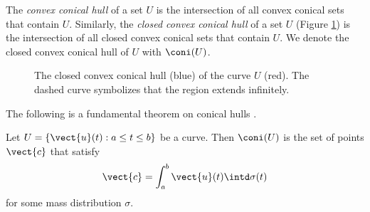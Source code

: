 The \emph{convex conical hull} of a set $U$ is the intersection of all convex conical sets that contain $U$. Similarly, the \emph{closed convex conical hull} of a set $U$ (Figure \ref{fig:closedconicalhullofU}) is the intersection of all closed convex conical sets that contain $U$. We denote the closed convex conical hull of $U$ with $\coni(U)$.
\begin{figure}[ht]
	\centering
	\caption{The closed convex conical hull (blue) of the curve $U$ (red). The dashed curve symbolizes that the region extends infinitely.}\label{fig:closedconicalhullofU}
\end{figure}

The following is a fundamental theorem on conical hulls \cite{Krein1977-ak}.
\begin{theorem}
	Let $U = \left \lbrace \vect{u}(t) : a \leq t \leq b \right\rbrace$ be a curve. Then $\coni(U)$ is the set of points $\vect{c}$ that satisfy
	\begin{equation}
		\vect{c} = \int_a^b \vect{u}(t) \intd \sigma(t)
	\end{equation}
	for some mass distribution $\sigma$.
	\label{thm:conicalhulls}
\end{theorem}


